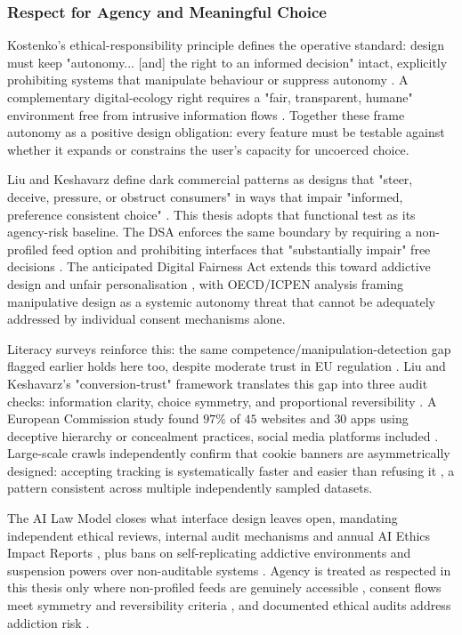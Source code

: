 \documentclass[11pt]{article}
\begin{document}
\subsubsection{Respect for Agency and Meaningful Choice}
\label{sec:respect_agency_choice} Kostenko's ethical-responsibility principle defines the operative standard: design must keep "autonomy... [and] the right to an informed decision" intact, explicitly prohibiting systems that manipulate behaviour or suppress autonomy \parencites[61--62]{2977039}. A complementary digital-ecology right requires a "fair, transparent, humane" environment free from intrusive information flows \parencites[119]{2977039}. Together these frame autonomy as a positive design obligation: every feature must be testable against whether it expands or constrains the user's capacity for uncoerced choice.

Liu and Keshavarz define dark commercial patterns as designs that "steer, deceive, pressure, or obstruct consumers" in ways that impair "informed, preference consistent choice" \parencites[3]{6087241}[39]{6087241}. This thesis adopts that functional test as its agency-risk baseline. The DSA enforces the same boundary by requiring a non-profiled feed option and prohibiting interfaces that "substantially impair" free decisions \parencites[7]{1456534}[18]{6941611}. The anticipated Digital Fairness Act extends this toward addictive design and unfair personalisation \parencites[390]{7896734}, with OECD/ICPEN analysis framing manipulative design as a systemic autonomy threat \parencites[391]{7896734} that cannot be adequately addressed by individual consent mechanisms alone.

Literacy surveys reinforce this: the same competence/manipulation-detection gap flagged earlier holds here too, despite moderate trust in EU regulation \parencites[31]{9360054}. Liu and Keshavarz's "conversion-trust" framework translates this gap into three audit checks: information clarity, choice symmetry, and proportional reversibility \parencites[39]{6087241}. A European Commission study found $97\%$ of $45$ websites and $30$ apps using deceptive hierarchy or concealment practices, social media platforms included \parencites[13]{6941611}. Large-scale crawls independently confirm that cookie banners are asymmetrically designed: accepting tracking is systematically faster and easier than refusing it \parencites[33]{6087241}, a pattern consistent across multiple independently sampled datasets.

The AI Law Model closes what interface design leaves open, mandating independent ethical reviews, internal audit mechanisms and annual AI Ethics Impact Reports \parencites[61--62]{2977039}, plus bans on self-replicating addictive environments and suspension powers over non-auditable systems \parencites[119]{2977039}[108]{2977039}. Agency is treated as respected in this thesis only where non-profiled feeds are genuinely accessible \parencites[390]{7896734}, consent flows meet symmetry and reversibility criteria \parencites[33]{6087241}, and documented ethical audits address addiction risk \parencites[61--62]{2977039}[119]{2977039}.
\end{document}

